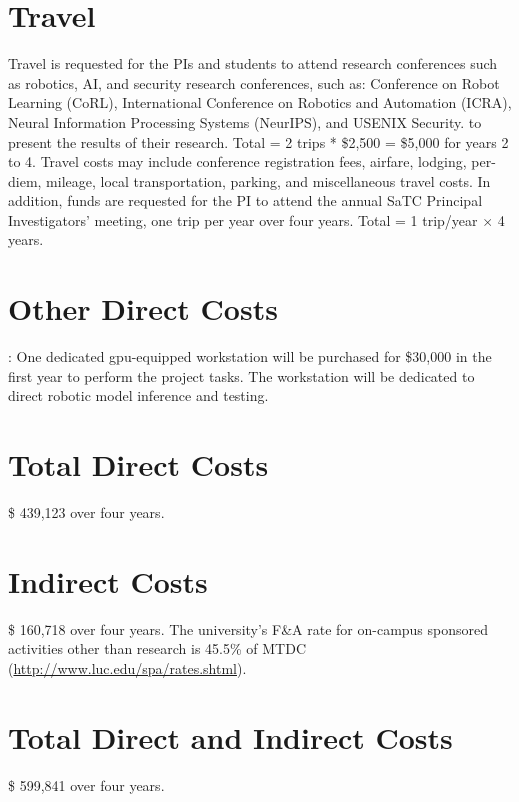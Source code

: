  
\section*{Travel}
Travel is requested for the PIs and students to attend research conferences such as robotics, AI, and security research conferences, such as:
Conference on Robot Learning (CoRL),
International Conference on Robotics and Automation (ICRA),
Neural Information Processing Systems (NeurIPS), and
USENIX Security.
to present the results of their research. 
Total = 2 trips * \$2,500 = \$5,000 for years 2 to 4. Travel costs may include conference registration fees, airfare, lodging, per-diem, mileage, local transportation, parking, and miscellaneous travel costs. 
In addition, funds are requested for the PI to attend the annual SaTC Principal Investigators' meeting, one trip per year over four years. 
Total = 1 trip/year $\times$ 4 years. 
 


 
\section*{Other Direct Costs}

: One dedicated gpu-equipped workstation will be purchased for \$30,000 in the first year to perform the project tasks. The workstation will be dedicated to direct robotic model inference and testing.






\section*{Total Direct Costs}

\$  439,123 over four years. %


\section*{Indirect Costs}

\$  160,718   over four years.  The university's F\&A rate for on-campus sponsored activities other than research is 45.5\% of MTDC  (\url{http://www.luc.edu/spa/rates.shtml}). %

 

\section*{Total Direct and Indirect Costs}

\$  599,841 over four years. %

 


